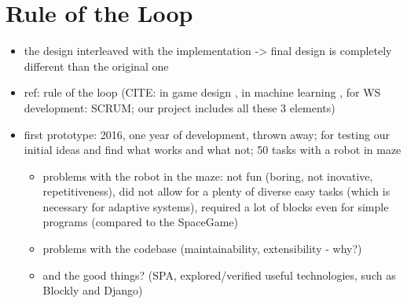 \section{Rule of the Loop}
\label{sec:robomission.rule-of-the-loop}

\begin{itemize}
\item the design interleaved with the implementation -> final design is completely different than the original one
\item ref: rule of the loop
  (CITE: in game design \cite{book-of-lenses},
  in machine learning \cite[][Rule \#16]{google-ml-rules},
  for WS development: SCRUM; our project includes all these 3 elements)
\item first prototype: 2016, one year of development, thrown away; for testing our initial ideas and find what works and what not; 50 tasks with a robot in maze
  \begin{itemize}
  \item problems with the robot in the maze: not fun (boring, not inovative, repetitiveness), did not allow for a plenty of diverse easy tasks (which is necessary for adaptive systems), required a lot of blocks even for simple programs (compared to the SpaceGame)
  \item problems with the codebase (maintainability, extensibility - why?)
  \item and the good things? (SPA, explored/verified useful technologies, such as Blockly and Django)
  \end{itemize}
\end{itemize}

